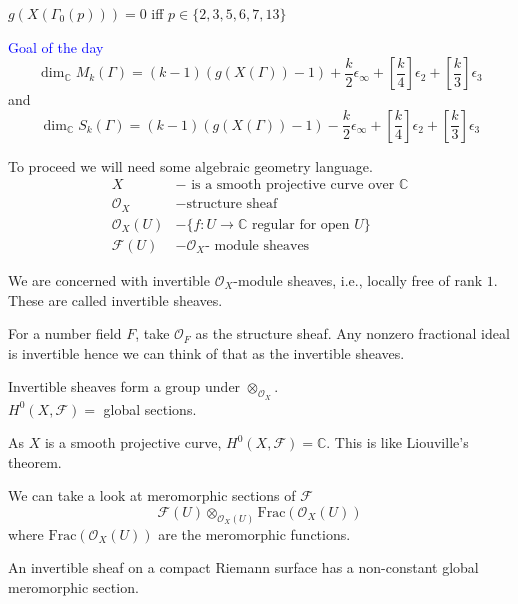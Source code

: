 \documentclass[oneside, 12pt, ]{scrbook}
\newcommand{\CC}{\mathbb C}
\theoremstyle{theorem}
\begin{document}
\begin{exercise}
$g(X(\Gamma_{0}(p)))=0$ iff $p \in \{2,3,5,6,7,13\}$
\end{exercise}

\textcolor{Blue}{Goal of the day} $$\dim_{\CC} M_{k}(\Gamma) = (k-1)(g(X(\Gamma))-1) + \frac{k}{2} \epsilon_{\infty} + \left[\frac{k}{4} \right]\epsilon_{2} + \left[ \frac{k}{3} \right]\epsilon_{3}$$ and $$\dim_{\CC} S_{k}(\Gamma) = (k-1)(g(X(\Gamma))-1) - \frac{k}{2} \epsilon_{\infty} + \left[\frac{k}{4} \right]\epsilon_{2} + \left[ \frac{k}{3} \right]\epsilon_{3}$$

To proceed we will need some algebraic geometry language. 
\begin{align*}
X &- \text{ is a smooth projective curve over } \CC \\
\mathcal{O}_{X} &- \text{structure sheaf} \\
\mathcal{O}_{X}(U) &- \{f: U \rightarrow \CC \text{ regular for open } U\}\\
\mathcal{F}(U) &- \mathcal{O}_{X}\text{- module sheaves}
\end{align*}

We are concerned with invertible $\mathcal{O}_{X}$-module sheaves, i.e., locally free of rank $1$. These are called invertible sheaves. 

\begin{example}
For a number field $F$, take $\mathcal{O}_{F}$ as the structure sheaf. Any nonzero fractional ideal is invertible hence we can think of that as the invertible sheaves.
\end{example}

Invertible sheaves form a group under $\otimes_{\mathcal{O}_{X}}$. \\

$H^{0}(X, \mathcal{F})=$ global sections. 

\begin{remark}
As $X$ is a smooth projective curve, $H^{0}(X, \mathcal{F})=\CC$. This is like Liouville's theorem.
\end{remark}

We can take a look at meromorphic sections of $\mathcal{F}$ $$\mathcal{F}(U) \otimes_{\mathcal{O}_{X}(U)} \mathrm{Frac}(\mathcal{O}_{X}(U))$$ where $\mathrm{Frac}(\mathcal{O}_{X}(U))$ are the meromorphic functions. 

\begin{theorem}
An invertible sheaf on a compact Riemann surface has a non-constant global meromorphic section.
\end{theorem}
\end{document}
